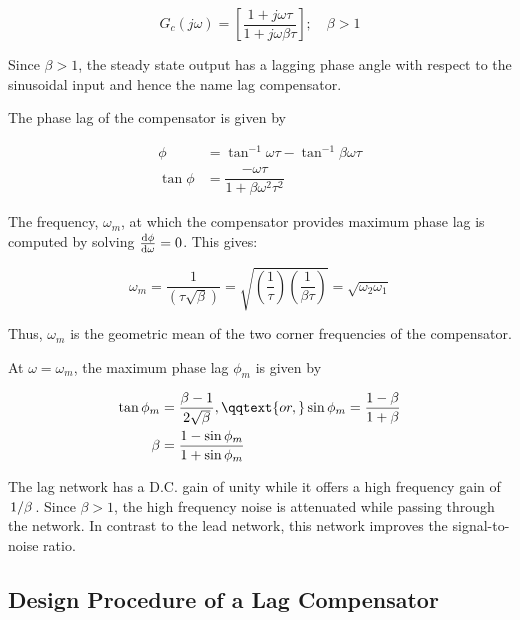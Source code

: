 \documentclass[
  14pt,
  a4paper,
  oneside,
  open=any,
  a4paper,
  14pt]{report}
\begin{document}
\[
    G_c(j\omega) = \left[\dfrac{1+j\omega\tau}{1+j\omega\beta\tau}\right]; \quad \beta > 1
\]

Since \(\beta > 1\), the steady state output has a lagging phase angle
with respect to the sinusoidal input and hence the name lag compensator.

The phase lag of the compensator is given by

\[
\begin{aligned}
    \phi &= \tan^{-1}\omega\tau - \tan^{-1}\beta\omega\tau \\
    \tan\phi &= \dfrac{-\omega\tau}{1+\beta\omega^2\tau^2}
\end{aligned}
\]

The frequency, \(\omega_m\), at which the compensator provides maximum
phase lag is computed by solving \(\odv{\phi}{\omega}=0\). This gives:

\[
    \omega_m = \dfrac{1}{(\tau\sqrt{\beta})} = \sqrt{\left(\dfrac{1}{\tau}\right)\left(\dfrac{1}{\beta\tau}\right)} = \sqrt{\omega_2\omega_1}
\]

Thus, \(\omega_m\) is the geometric mean of the two corner frequencies
of the compensator.

At \(\omega = \omega_m\), the maximum phase lag \(\phi_m\) is given by

\[
\begin{aligned}
    \tan\phi_m &= \dfrac{\beta-1}{2\sqrt{\beta}}, \qqtext{or,} \sin\phi_m = \dfrac{1-\beta}{1+\beta}  \\
    \beta &= \dfrac{1-\sin\phi_m}{1+\sin\phi_m}
\end{aligned}
\]

The lag network has a D.C. gain of unity while it offers a high
frequency gain of \(\left.1\middle\slash\beta\right.\). Since \(\beta > 1\), the high
frequency noise is attenuated while passing through the network. In
contrast to the lead network, this network improves the signal-to-noise
ratio.

\subsection{Design Procedure of a Lag
Compensator}\label{design-procedure-of-a-lag-compensator}
\end{document}
